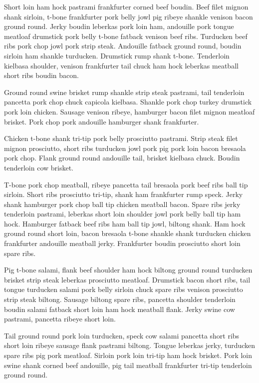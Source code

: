 Short loin ham hock pastrami frankfurter corned beef boudin. Beef filet mignon shank sirloin, t-bone frankfurter pork belly jowl pig ribeye shankle venison bacon ground round. Jerky boudin leberkas pork loin ham, andouille pork tongue meatloaf drumstick pork belly t-bone fatback venison beef ribs. Turducken beef ribs pork chop jowl pork strip steak. Andouille fatback ground round, boudin sirloin ham shankle turducken. Drumstick rump shank t-bone. Tenderloin kielbasa shoulder, venison frankfurter tail chuck ham hock leberkas meatball short ribs boudin bacon.

Ground round swine brisket rump shankle strip steak pastrami, tail tenderloin pancetta pork chop chuck capicola kielbasa. Shankle pork chop turkey drumstick pork loin chicken. Sausage venison ribeye, hamburger bacon filet mignon meatloaf brisket. Pork chop pork andouille hamburger shank frankfurter.

Chicken t-bone shank tri-tip pork belly prosciutto pastrami. Strip steak filet mignon prosciutto, short ribs turducken jowl pork pig pork loin bacon bresaola pork chop. Flank ground round andouille tail, brisket kielbasa chuck. Boudin tenderloin cow brisket.

T-bone pork chop meatball, ribeye pancetta tail bresaola pork beef ribs ball tip sirloin. Short ribs prosciutto tri-tip, shank ham frankfurter rump speck. Jerky shank hamburger pork chop ball tip chicken meatball bacon. Spare ribs jerky tenderloin pastrami, leberkas short loin shoulder jowl pork belly ball tip ham hock. Hamburger fatback beef ribs ham ball tip jowl, biltong shank. Ham hock ground round short loin, bacon bresaola t-bone shankle shank turducken chicken frankfurter andouille meatball jerky. Frankfurter boudin prosciutto short loin spare ribs.

Pig t-bone salami, flank beef shoulder ham hock biltong ground round turducken brisket strip steak leberkas prosciutto meatloaf. Drumstick bacon short ribs, tail tongue turducken salami pork belly sirloin chuck spare ribs venison prosciutto strip steak biltong. Sausage biltong spare ribs, pancetta shoulder tenderloin boudin salami fatback short loin ham hock meatball flank. Jerky swine cow pastrami, pancetta ribeye short loin.

Tail ground round pork loin turducken, speck cow salami pancetta short ribs short loin ribeye sausage flank pastrami biltong. Tongue leberkas jerky, turducken spare ribs pig pork meatloaf. Sirloin pork loin tri-tip ham hock brisket. Pork loin swine shank corned beef andouille, pig tail meatball frankfurter tri-tip tenderloin ground round.

